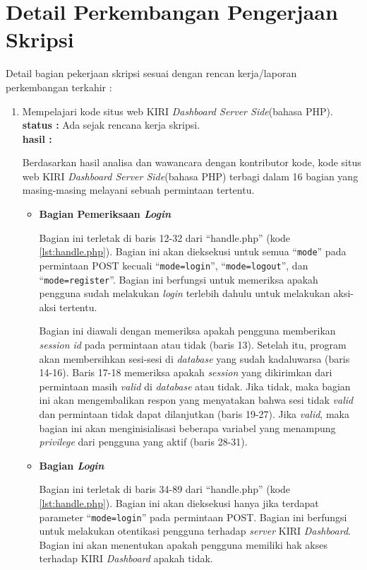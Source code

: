 \documentclass[a4paper,twoside]{article}
\begin{document}
\section{Detail Perkembangan Pengerjaan Skripsi}
Detail bagian pekerjaan skripsi sesuai dengan rencan kerja/laporan perkembangan terkahir :
	\begin{enumerate}
		\item Mempelajari kode situs web KIRI \textit{Dashboard Server Side}(bahasa PHP).\\
		{\bf status :} Ada sejak rencana kerja skripsi.\\
		{\bf hasil :}
		

		Berdasarkan hasil analisa dan wawancara dengan kontributor kode, kode situs web KIRI \textit{Dashboard Server Side}(bahasa PHP) terbagi dalam 16 bagian yang masing-masing melayani sebuah permintaan tertentu.

\begin{itemize}
\item \textbf{Bagian Pemeriksaan \textit{Login}}

Bagian ini terletak di baris 12-32 dari ``handle.php'' (kode \ref{lst:handle.php}). Bagian ini akan dieksekusi untuk semua ``\texttt{mode}'' pada permintaan POST kecuali ``\texttt{mode=login}'', ``\texttt{mode=logout}'', dan ``\texttt{mode=register}''. Bagian ini berfungsi untuk memeriksa apakah pengguna sudah melakukan \textit{login} terlebih dahulu untuk melakukan aksi-aksi tertentu.

Bagian ini diawali dengan memeriksa apakah pengguna memberikan \textit{session id} pada permintaan atau tidak (baris 13). Setelah itu, program akan membersihkan sesi-sesi di \textit{database} yang sudah kadaluwarsa (baris 14-16). Baris 17-18 memeriksa apakah \textit{session} yang dikirimkan dari permintaan masih \textit{valid} di \textit{database} atau tidak. Jika tidak, maka bagian ini akan mengembalikan respon yang menyatakan bahwa sesi tidak \textit{valid} dan permintaan tidak dapat dilanjutkan (baris 19-27). Jika \textit{valid}, maka bagian ini akan menginisialisasi beberapa variabel yang menampung \textit{privilege} dari pengguna yang aktif (baris 28-31).

\item \textbf{Bagian \textit{Login}}

Bagian ini terletak di baris 34-89 dari ``handle.php'' (kode \ref{lst:handle.php}). Bagian ini akan dieksekusi hanya jika terdapat parameter ``\texttt{mode=login}'' pada permintaan POST. Bagian ini berfungsi untuk melakukan otentikasi pengguna terhadap \textit{server} KIRI \textit{Dashboard}. Bagian ini akan menentukan apakah pengguna memiliki hak akses terhadap KIRI \textit{Dashboard} apakah tidak.


\end{itemize}
\end{enumerate}
\end{document}
